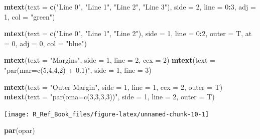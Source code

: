 \documentclass[]{book}
\newenvironment{Shaded}{\begin{snugshade}}{\end{snugshade}}
\newcommand{\KeywordTok}[1]{\textcolor[rgb]{0.13,0.29,0.53}{\textbf{#1}}}
\newcommand{\DataTypeTok}[1]{\textcolor[rgb]{0.13,0.29,0.53}{#1}}
\newcommand{\DecValTok}[1]{\textcolor[rgb]{0.00,0.00,0.81}{#1}}
\newcommand{\StringTok}[1]{\textcolor[rgb]{0.31,0.60,0.02}{#1}}
\newcommand{\OperatorTok}[1]{\textcolor[rgb]{0.81,0.36,0.00}{\textbf{#1}}}
\newcommand{\NormalTok}[1]{#1}
\begin{document}
\begin{Shaded}
\begin{Highlighting}[]
\KeywordTok{mtext}\NormalTok{(}\DataTypeTok{text =} \KeywordTok{c}\NormalTok{(}\StringTok{"Line 0"}\NormalTok{,}
               \StringTok{"Line 1"}\NormalTok{,}
               \StringTok{"Line 2"}\NormalTok{,}
               \StringTok{"Line 3"}\NormalTok{),}
      \DataTypeTok{side =} \DecValTok{2}\NormalTok{, }\DataTypeTok{line =} \DecValTok{0}\OperatorTok{:}\DecValTok{3}\NormalTok{,}
      \DataTypeTok{adj =} \DecValTok{1}\NormalTok{,}
      \DataTypeTok{col =} \StringTok{"green"}\NormalTok{)}

\KeywordTok{mtext}\NormalTok{(}\DataTypeTok{text =} \KeywordTok{c}\NormalTok{(}\StringTok{"Line 0"}\NormalTok{,}
               \StringTok{"Line 1"}\NormalTok{,}
               \StringTok{"Line 2"}\NormalTok{),}
      \DataTypeTok{side =} \DecValTok{1}\NormalTok{, }\DataTypeTok{line =} \DecValTok{0}\OperatorTok{:}\DecValTok{2}\NormalTok{, }\DataTypeTok{outer =}\NormalTok{ T,}
      \DataTypeTok{at =} \DecValTok{0}\NormalTok{, }\DataTypeTok{adj =} \DecValTok{0}\NormalTok{,}
      \DataTypeTok{col =} \StringTok{"blue"}\NormalTok{)}


\KeywordTok{mtext}\NormalTok{(}\DataTypeTok{text =} \StringTok{"Margins"}\NormalTok{,}
      \DataTypeTok{side =} \DecValTok{1}\NormalTok{, }\DataTypeTok{line =} \DecValTok{2}\NormalTok{, }\DataTypeTok{cex =} \DecValTok{2}\NormalTok{)}
\KeywordTok{mtext}\NormalTok{(}\DataTypeTok{text =} \StringTok{"par(mar=c(5,4,4,2) + 0.1)"}\NormalTok{,}
      \DataTypeTok{side =} \DecValTok{1}\NormalTok{, }\DataTypeTok{line =} \DecValTok{3}\NormalTok{)}

\KeywordTok{mtext}\NormalTok{(}\DataTypeTok{text =} \StringTok{"Outer Margin"}\NormalTok{,}
      \DataTypeTok{side =} \DecValTok{1}\NormalTok{, }\DataTypeTok{line =} \DecValTok{1}\NormalTok{, }\DataTypeTok{cex =} \DecValTok{2}\NormalTok{, }\DataTypeTok{outer =}\NormalTok{ T)}
\KeywordTok{mtext}\NormalTok{(}\DataTypeTok{text =} \StringTok{"par(oma=c(3,3,3,3))"}\NormalTok{,}
      \DataTypeTok{side =} \DecValTok{1}\NormalTok{, }\DataTypeTok{line =} \DecValTok{2}\NormalTok{, }\DataTypeTok{outer =}\NormalTok{ T)}
\end{Highlighting}
\end{Shaded}

\begin{center}\texttt{[image: R\_Ref\_Book\_files/figure-latex/unnamed-chunk-10-1]} \end{center}

\begin{Shaded}
\begin{Highlighting}[]
\KeywordTok{par}\NormalTok{(opar)}
\end{Highlighting}
\end{Shaded}
\end{document}
